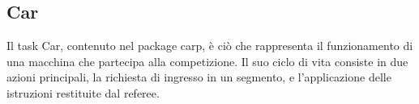 \subsection{Car}

Il task Car, contenuto nel package car\textunderscore p, è ciò che rappresenta il funzionamento di una macchina che partecipa alla competizione.
Il suo ciclo di vita consiste in due azioni principali, la richiesta di ingresso in un segmento, e l’applicazione delle istruzioni restituite dal referee.

\noindent%
\begin{minipage}{\linewidth}
\label{car_p_ciclo}
\end{minipage}

